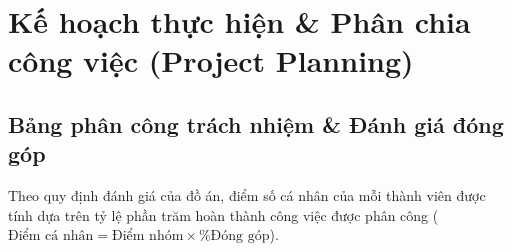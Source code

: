 \documentclass[12pt,a4paper]{article}
\begin{document}
\newpage
\tableofcontents
\newpage

\section{Kế hoạch thực hiện \& Phân chia công việc (Project Planning)}

\subsection{Bảng phân công trách nhiệm \& Đánh giá đóng góp}
Theo quy định đánh giá của đồ án, điểm số cá nhân của mỗi thành viên được tính dựa trên tỷ lệ phần trăm hoàn thành công việc được phân công ($\text{Điểm cá nhân} = \text{Điểm nhóm} \times \text{\% Đóng góp}$).
\end{document}
